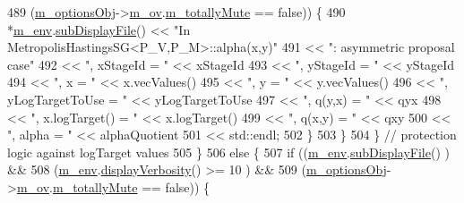 \begin{DoxyCode}
489             (\hyperlink{class_q_u_e_s_o_1_1_metropolis_hastings_s_g_a5d0bc9f73d50d272aa6bfb5ef5939ef3}{m\_optionsObj}->\hyperlink{class_q_u_e_s_o_1_1_metropolis_hastings_s_g_options_a9d4792d9fc2dc5439b8ab489b0c236eb}{m\_ov}.\hyperlink{class_q_u_e_s_o_1_1_mh_options_values_af812309e81191e88dfdc87c5815141a3}{m\_totallyMute} == \textcolor{keyword}{false})) \{
490           *\hyperlink{class_q_u_e_s_o_1_1_metropolis_hastings_s_g_ac8ea061e55b920e0c8f9bce5c3f20e52}{m\_env}.\hyperlink{class_q_u_e_s_o_1_1_base_environment_a8a0064746ae8dddfece4229b9ad374d6}{subDisplayFile}() << \textcolor{stringliteral}{"In MetropolisHastingsSG<P\_V,P\_M>::alpha(x,y)"}
491                                  << \textcolor{stringliteral}{": asymmetric proposal case"}
492                                  << \textcolor{stringliteral}{", xStageId = "}        << xStageId
493                                  << \textcolor{stringliteral}{", yStageId = "}        << yStageId
494                                  << \textcolor{stringliteral}{", x = "}               << x.vecValues()
495                                  << \textcolor{stringliteral}{", y = "}               << y.vecValues()
496                                  << \textcolor{stringliteral}{", yLogTargetToUse = "} << yLogTargetToUse
497                                  << \textcolor{stringliteral}{", q(y,x) = "}          << qyx
498                                  << \textcolor{stringliteral}{", x.logTarget() = "}   << x.logTarget()
499                                  << \textcolor{stringliteral}{", q(x,y) = "}          << qxy
500                                  << \textcolor{stringliteral}{", alpha = "}           << alphaQuotient
501                                  << std::endl;
502         \}
503       \}
504     \} \textcolor{comment}{// protection logic against logTarget values}
505   \}
506   \textcolor{keywordflow}{else} \{
507     \textcolor{keywordflow}{if} ((\hyperlink{class_q_u_e_s_o_1_1_metropolis_hastings_s_g_ac8ea061e55b920e0c8f9bce5c3f20e52}{m\_env}.\hyperlink{class_q_u_e_s_o_1_1_base_environment_a8a0064746ae8dddfece4229b9ad374d6}{subDisplayFile}()                   ) &&
508         (\hyperlink{class_q_u_e_s_o_1_1_metropolis_hastings_s_g_ac8ea061e55b920e0c8f9bce5c3f20e52}{m\_env}.\hyperlink{class_q_u_e_s_o_1_1_base_environment_a1fe5f244fc0316a0ab3e37463f108b96}{displayVerbosity}() >= 10           ) &&
509         (\hyperlink{class_q_u_e_s_o_1_1_metropolis_hastings_s_g_a5d0bc9f73d50d272aa6bfb5ef5939ef3}{m\_optionsObj}->\hyperlink{class_q_u_e_s_o_1_1_metropolis_hastings_s_g_options_a9d4792d9fc2dc5439b8ab489b0c236eb}{m\_ov}.\hyperlink{class_q_u_e_s_o_1_1_mh_options_values_af812309e81191e88dfdc87c5815141a3}{m\_totallyMute} == \textcolor{keyword}{false})) \{

\end{DoxyCode}

